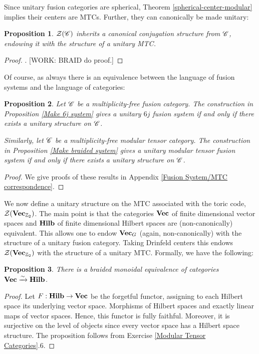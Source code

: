\documentclass{article}
\newtheorem{proposition}{Proposition}[section]
\theoremstyle{definition}
\numberwithin{figure}{section}
\begin{document}
Since unitary fusion categories are spherical, Theorem \ref{spherical-center-modular} implies their centers are MTCs. Further, they can canonically be made unitary:

\begin{proposition}\label{unitary MTC}$ \mathcal{Z}(\mathscr{C})$ inherits a canonical conjugation structure from $\mathscr{C}$, endowing it with the structure of a unitary MTC.
\end{proposition}
\begin{proof}. [WORK: BRAID do proof.]
\end{proof}

Of course, as always there is an equivalence between the language of fusion systems and the language of categories:

\begin{proposition}\label{Make uMTC} Let $\mathscr{C}$ be a multiplicity-free fusion category. The construction in Proposition \ref{Make 6j system} gives a unitary $6j$ fusion system if and only if there exists a unitary structure on $\mathscr{C}$.

Similarly, let $\mathscr{C}$ be a multiplicity-free modular tensor category. The construction in Proposition \ref{Make braided system} gives a unitary modular tensor fusion system if and only if there exists a unitary structure on $\mathscr{C}$.
\end{proposition}
\begin{proof} We give proofs of these results in Appendix \ref{Fusion System/MTC correspondence}.
\end{proof}

We now define a unitary structure on the MTC associated with the toric code, $\mathcal{Z}(\bold{Vec}_{\mathbb{Z}_2})$. The main point is that the categories $\bold{Vec}$ of finite dimensional vector spaces and $\bold{Hilb}$ of finite dimensional Hilbert spaces are (non-canonically) equivalent. This allows one to endow $\bold{Vec}_{G}$ (again, non-canonically) with the structure of a unitary fusion category. Taking Drinfeld centers this endows $\mathcal{Z}(\bold{Vec}_{\mathbb{Z}_2})$ with the structure of a unitary MTC. Formally, we have the following:

\begin{proposition} There is a braided monoidal equivalence of categories $\bold{Vec}\xrightarrow{\sim}\bold{Hilb}$.
\end{proposition}
\begin{proof} Let $F:\bold{Hilb}\to \bold{Vec}$ be the forgetful functor, assigning to each Hilbert space its underlying vector space. Morphisms of Hilbert spaces and exactly linear maps of vector spaces. Hence, this functor is fully faithful. Moreover, it is surjective on the level of objects since every vector space has a Hilbert space structure. The proposition follows from Exercise \ref{Modular Tensor Categories}.6.
\end{proof}
\end{document}
